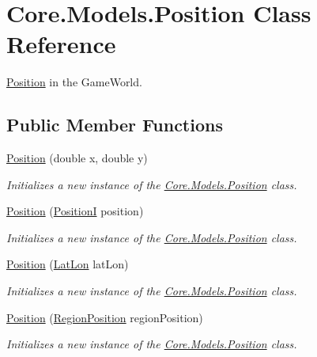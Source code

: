 \hypertarget{classCore_1_1Models_1_1Position}{}\section{Core.\+Models.\+Position Class Reference}
\label{classCore_1_1Models_1_1Position}


\hyperlink{classCore_1_1Models_1_1Position}{Position} in the Game\+World.  


\subsection*{Public Member Functions}
\begin{DoxyCompactItemize}
\item 
\hyperlink{classCore_1_1Models_1_1Position_ab6b49792138b5a0a22e13525acdacc9a}{Position} (double x, double y)
\begin{DoxyCompactList}\small\item\em Initializes a new instance of the \hyperlink{classCore_1_1Models_1_1Position}{Core.\+Models.\+Position} class. \end{DoxyCompactList}\item 
\hyperlink{classCore_1_1Models_1_1Position_a86b378bb7e6fbd16182fe0b169d23897}{Position} (\hyperlink{classCore_1_1Models_1_1PositionI}{Position\+I} position)
\begin{DoxyCompactList}\small\item\em Initializes a new instance of the \hyperlink{classCore_1_1Models_1_1Position}{Core.\+Models.\+Position} class. \end{DoxyCompactList}\item 
\hyperlink{classCore_1_1Models_1_1Position_a776d640b97d31e7460fe4a850299a4f0}{Position} (\hyperlink{classCore_1_1Models_1_1LatLon}{Lat\+Lon} lat\+Lon)
\begin{DoxyCompactList}\small\item\em Initializes a new instance of the \hyperlink{classCore_1_1Models_1_1Position}{Core.\+Models.\+Position} class. \end{DoxyCompactList}\item 
\hyperlink{classCore_1_1Models_1_1Position_a74d6d9f0c6f39849f0515b1c837fa2ef}{Position} (\hyperlink{classCore_1_1Models_1_1RegionPosition}{Region\+Position} region\+Position)
\begin{DoxyCompactList}\small\item\em Initializes a new instance of the \hyperlink{classCore_1_1Models_1_1Position}{Core.\+Models.\+Position} class. \end{DoxyCompactList}\item 

\end{DoxyCompactItemize}

